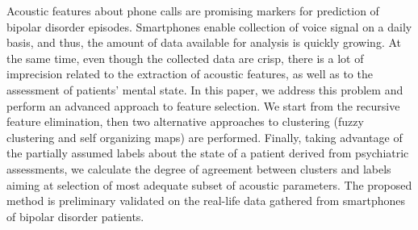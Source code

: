 


Acoustic features about phone calls are promising markers for prediction of bipolar disorder episodes. Smartphones enable collection of voice signal on a daily basis, and thus, the amount of data available for analysis is quickly growing. At the same time, even though the collected data are crisp, there is a lot of imprecision related to the extraction of acoustic features, as well as to the assessment of patients' mental state. In this paper, we address this problem and perform an advanced approach to feature selection. We start from the recursive feature elimination, then two alternative approaches to clustering (fuzzy clustering and self organizing maps) are performed.
Finally, taking advantage of the partially assumed labels about the state of a patient derived from psychiatric assessments, we calculate the degree of agreement between clusters and labels aiming at selection of most adequate subset of acoustic parameters. The proposed method is preliminary validated on the real-life data gathered from smartphones of bipolar disorder patients.


